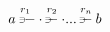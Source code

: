 \newcommand{\rightpitchfork}{\text{\raisebox{0pt}{\rotatebox[origin=c]{-90}{\scalebox{0.7}{$\pitchfork$}}}}}
$\overset{r_1}{a \hspace{0.3em} \rightpitchfork \hspace{-0.35em} -  \cdot} \overset{r_2}{\rightpitchfork \hspace{-0.35em} -} \cdot ... \overset{r_n}{\rightpitchfork \hspace{-0.35em} -} b$
